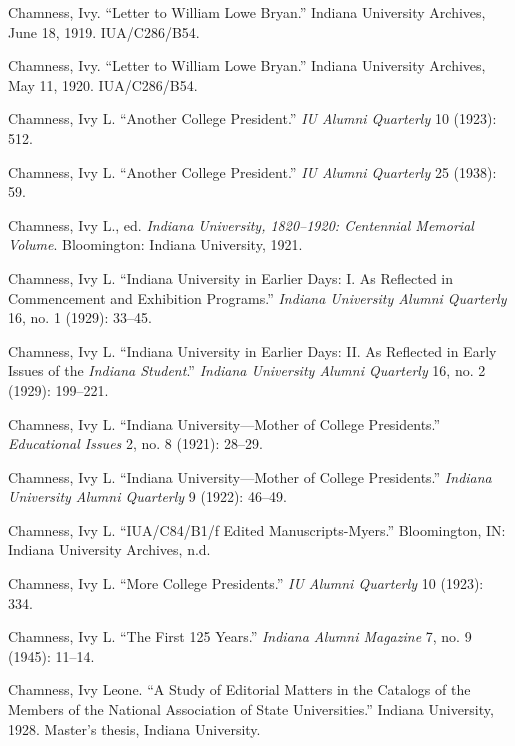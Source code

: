 \documentclass[
  american,
  letterpaper,
]{scrreprt}
\newlength{\cslhangindent}
\newenvironment{CSLReferences}[2] %
 {\begin{list}{}{%
  \setlength{\itemindent}{0pt}
  \setlength{\leftmargin}{0pt}
  \setlength{\parsep}{0pt}
  \ifodd #1
   \setlength{\leftmargin}{\cslhangindent}
   \setlength{\itemindent}{-1\cslhangindent}
  \fi
  \setlength{\itemsep}{#2\baselineskip}}}
 {\end{list}}
\begin{document}
\begin{CSLReferences}{1}{0}
Chamness, Ivy. {``Letter to William Lowe Bryan.''} Indiana University
Archives, June 18, 1919. IUA/C286/B54.

Chamness, Ivy. {``Letter to William Lowe Bryan.''} Indiana University
Archives, May 11, 1920. IUA/C286/B54.

Chamness, Ivy L. {``Another College President.''} \emph{IU Alumni
Quarterly} 10 (1923): 512.

Chamness, Ivy L. {``Another College President.''} \emph{IU Alumni
Quarterly} 25 (1938): 59.

Chamness, Ivy L., ed. \emph{Indiana University, 1820--1920: Centennial
Memorial Volume}. Bloomington: Indiana University, 1921.

Chamness, Ivy L. {``Indiana University in Earlier Days: I. As Reflected
in Commencement and Exhibition Programs.''} \emph{Indiana University
Alumni Quarterly} 16, no. 1 (1929): 33--45.

Chamness, Ivy L. {``Indiana University in Earlier Days: II. As Reflected
in Early Issues of the \emph{Indiana Student}.''} \emph{Indiana
University Alumni Quarterly} 16, no. 2 (1929): 199--221.

Chamness, Ivy L. {``Indiana University---Mother of College
Presidents.''} \emph{Educational Issues} 2, no. 8 (1921): 28--29.

Chamness, Ivy L. {``Indiana University---Mother of College
Presidents.''} \emph{Indiana University Alumni Quarterly} 9 (1922):
46--49.

Chamness, Ivy L. {``IUA/C84/B1/f Edited Manuscripts-Myers.''}
Bloomington, IN: Indiana University Archives, n.d.

Chamness, Ivy L. {``More College Presidents.''} \emph{IU Alumni
Quarterly} 10 (1923): 334.

Chamness, Ivy L. {``The First 125 Years.''} \emph{Indiana Alumni
Magazine} 7, no. 9 (1945): 11--14.

Chamness, Ivy Leone. {``A Study of Editorial Matters in the Catalogs of
the Members of the National Association of State Universities.''}
Indiana University, 1928. Master's thesis, Indiana University.


\end{CSLReferences}
\end{document}
